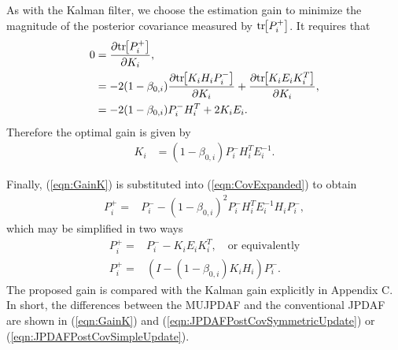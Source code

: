 \documentclass[letterpaper, 10pt, conference]{ieeeconf}
\newcommand{\bracket}[1]{\ensuremath{\left[ #1 \right]}}
\newcommand{\refeqn}[1]{(\ref{eqn:#1})}
\newcommand{\tr}[1]{\mathrm{tr}\ensuremath{\negthickspace\bracket{#1}}}
\begin{document}
As with the Kalman filter, we choose the estimation gain to minimize the magnitude of the posterior covariance measured by $\tr{P_i^+}$.
It requires that
%
\begin{align}
0&=\frac{\partial\tr{P^+_i}}{\partial K_i},\nonumber
\\
&=-2(1-\beta_{0,i})\frac{\partial\tr{K_iH_iP^-_i}}{\partial K_i}+\frac{\partial\tr{K_iE_iK_i^T}}{\partial K_i},\nonumber
\\
&=-2(1-\beta_{0,i})P^-_iH_i^T+2K_iE_i.\label{eqn:Uncertainty0}
\end{align}
Therefore the optimal gain is given by
\begin{align}
K_i&=(1-\beta_{0,i})P^-_iH_i^TE_i^{-1}.\label{eqn:GainK}
\end{align}

Finally, \refeqn{GainK} is substituted into \refeqn{CovExpanded} to obtain
\begin{align}
P^+_{i}=&P^-_{i}-(1-\beta_{0,i})^2P^-_iH_i^TE_i^{-1}H_iP^-_i,
\end{align}
which may be simplified in two ways
\begin{align}
P^+_{i}=&P^-_{i}-K_iE_iK_i^T, \quad \mbox{or equivalently}\label{eqn:JPDAFPostCovSymmetricUpdate}
\\
P^+_{i}=&\left(I-(1-\beta_{0,i})K_iH_i\right)P^-_i.\label{eqn:JPDAFPostCovSimpleUpdate}
\end{align}
The proposed gain is compared with the Kalman gain explicitly in Appendix C.
In short, the differences between the MUJPDAF and the conventional JPDAF are shown in \refeqn{GainK} and \refeqn{JPDAFPostCovSymmetricUpdate} or \refeqn{JPDAFPostCovSimpleUpdate}.
\end{document}
